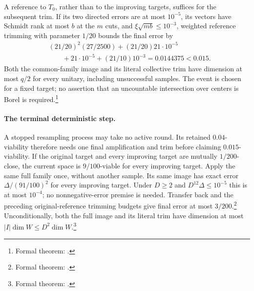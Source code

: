 \documentclass{article}
\begin{document}
A reference to $T_0$, rather than to the improving targets, suffices for
the subsequent trim. If its two directed errors are at most $10^{-5}$,
its vectors have Schmidt rank at most $b$ at the $m$ cuts, and
$\xi\sqrt{mb}\le10^{-3}$, weighted reference trimming with parameter
$1/20$ bounds the final error by
\[
\begin{aligned}
 &(21/20)^2(27/2500)+(21/20)21\cdot10^{-5}\\
 &\qquad{}+21\cdot10^{-5}+(21/10)10^{-3}
   =0.0144375<0.015.
\end{aligned}
\]
Both the common-family image and its literal collective trim have
dimension at most $q/2$ for every unitary, including unsuccessful samples.
The event is chosen for a fixed target; no assertion that an uncountable
intersection over centers is Borel is required.\footnote{Formal theorem:
.}

\paragraph{The terminal deterministic step.}
A stopped resampling process may take no active round. Its retained
$0.04$-viability therefore needs one final amplification and trim before
claiming $0.015$-viability. If the original target and every improving target
are mutually $1/200$-close, the current space is $9/100$-viable for every
improving target. Apply the same full family once, without another sample.
Its same image has exact error $\Delta/(91/100)^2$ for every improving
target. Under $D\ge2$ and $D^{12}\Delta\le10^{-5}$ this is at most $10^{-4}$;
no nonnegative-error premise is needed. Transfer back and the preceding
original-reference trimming budgets give final error at most
$3/200$.\footnote{Formal theorem:
.}
Unconditionally, both the full image and its literal trim have dimension
at most $|I|\dim W\le D^2\dim W$.\footnote{Formal theorem:
.}
\end{document}
